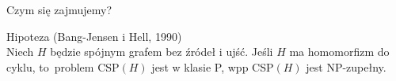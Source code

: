 \begin{frame}{Czym się zajmujemy?}

    \textcolor{cfblue}{Hipoteza (Bang-Jensen i Hell, 1990)} \\
    Niech \(H\) będzie spójnym grafem bez źródeł i ujść. Jeśli \(H\) ma homomorfizm do cyklu, to~problem CSP\((H)\) jest w klasie P, wpp CSP\((H)\) jest NP-zupełny.


\vspace{1.5em}
\begin{figure}
    \centering
    
\end{figure}

\end{frame}